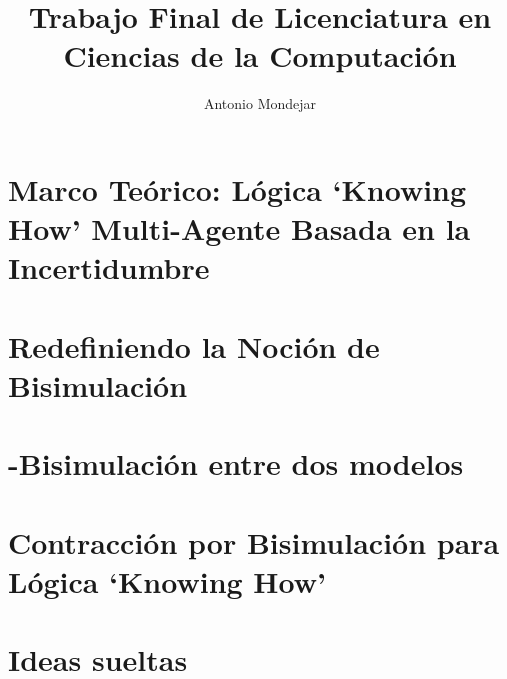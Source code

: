 \documentclass[a4paper,10pt]{article}
\begin{document}
\title{Trabajo Final de Licenciatura en Ciencias de la Computación}

\author{Antonio Mondejar}

\maketitle

\section{Marco Teórico: Lógica `Knowing How' Multi-Agente Basada en la Incertidumbre}
    

\section{Redefiniendo la Noción de Bisimulación}
    

\section{\KHilogic-Bisimulación entre dos modelos}
    
        
\section{Contracción por Bisimulación para Lógica `Knowing How'}
    

\section{Ideas sueltas}
    




\end{document}

